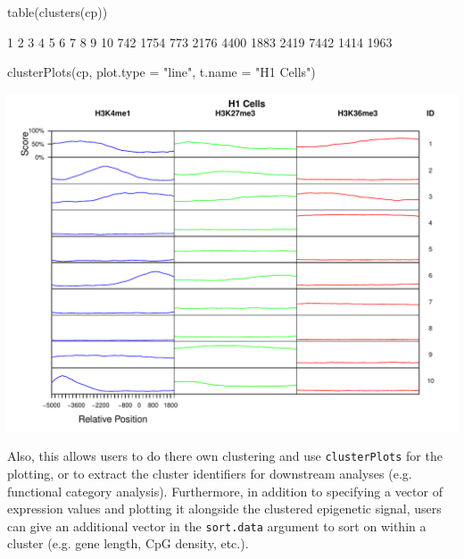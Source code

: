 \begin{Schunk}
\begin{Sinput}
 table(clusters(cp))
\end{Sinput}
\begin{Soutput}
   1    2    3    4    5    6    7    8    9   10 
 742 1754  773 2176 4400 1883 2419 7442 1414 1963 
\end{Soutput}
\begin{Sinput}
 clusterPlots(cp, plot.type = "line", t.name = "H1 Cells")
\end{Sinput}
\end{Schunk}
\includegraphics{visualisations-cluPlots3}

Also, this allows users to do there own clustering and use \texttt{clusterPlots} for the plotting, or to extract the cluster identifiers for downstream analyses (e.g. functional category analysis).  Furthermore, in addition to specifying a vector of expression values and plotting it alongside the clustered epigenetic signal, users can give an additional vector in the \texttt{sort.data} argument to sort on within a cluster (e.g. gene length, CpG density, etc.).
